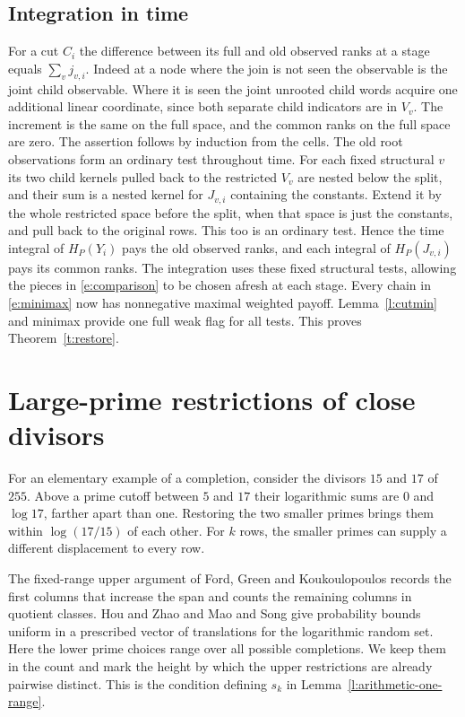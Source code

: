 \documentclass[11pt]{article}
\numberwithin{equation}{section}
\begin{document}
\subsection{Integration in time}

For a cut $C_i$ the difference between its full and old observed
ranks at a stage equals $\sum_v j_{v,i}$. Indeed at a node where
the join is not seen the observable is the joint child observable.
Where it is seen the joint unrooted child words acquire one
additional linear coordinate, since both separate child indicators
are in $V_v$. The increment is the same on the full space, and
the common ranks on the full space are zero. The assertion follows
by induction from the cells. The old root observations form an
ordinary test throughout time. For each fixed structural $v$ its
two child kernels pulled back to the restricted $V_v$ are nested
below the split, and their sum is a nested kernel for $J_{v,i}$
containing the constants. Extend it by the whole restricted
space before the split, when that space is just the constants,
and pull back to the original rows. This too is an ordinary test.
Hence the time integral of $H_P(Y_i)$ pays the old observed ranks,
and each integral of $H_P(J_{v,i})$ pays its common ranks.
The integration uses these fixed structural tests, allowing
the pieces in \eqref{e:comparison} to be chosen afresh at each stage. Every chain in \eqref{e:minimax} now has nonnegative
maximal weighted payoff. Lemma~\ref{l:cutmin} and minimax provide
one full weak flag for all tests. This proves
Theorem~\ref{t:restore}.

\section{Large-prime restrictions of close divisors}\label{s:arith}

For an elementary example of a completion, consider the divisors
$15$ and $17$ of $255$. Above a prime cutoff between $5$ and $17$
their logarithmic sums are $0$ and $\log17$, farther apart than
one. Restoring the two smaller primes brings them within
$\log(17/15)$ of each other. For $k$ rows, the smaller primes
can supply a different displacement to every row.

The fixed-range upper argument of Ford, Green and Koukoulopoulos
\cite[Section~4]{fgk} records the first columns that increase the
span and counts the remaining columns in quotient classes. Hou and
Zhao \cite[Lemma~5]{hz} and Mao and Song \cite[Theorem~3.6]{ms}
give probability bounds uniform in a prescribed vector of
translations for the logarithmic random set. Here the lower
prime choices range over all possible completions. We keep them
in the count and mark the height by which the upper restrictions
are already pairwise distinct. This is the condition defining
$s_k$ in Lemma~\ref{l:arithmetic-one-range}.
\end{document}
